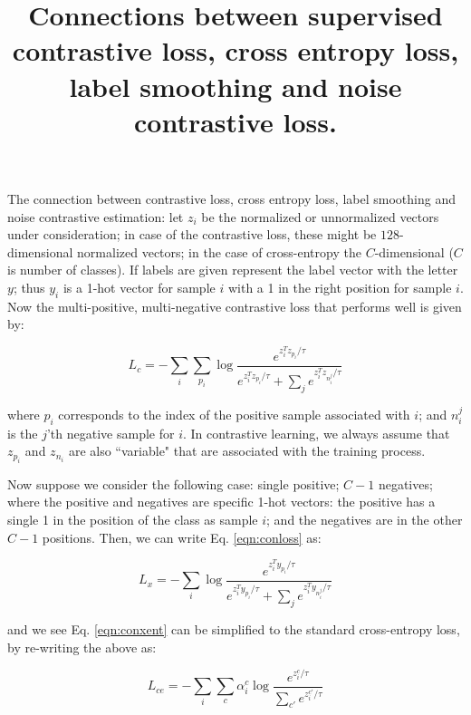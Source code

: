 \documentclass[10pt,letterpaper]{article}
\begin{document}
\title{Connections between supervised contrastive loss, cross entropy loss, label smoothing and noise contrastive loss.}

\maketitle

The connection between contrastive loss, cross entropy loss, label smoothing and noise contrastive estimation: let $z_i$ be the normalized or unnormalized vectors under consideration; in case of the contrastive loss, these might be $128$-dimensional normalized vectors; in the case of cross-entropy the $C$-dimensional ($C$ is number of classes). If labels are given represent the label vector with the letter $y$; thus $y_i$ is a 1-hot vector for sample $i$ with a 1 in the right position for sample $i$. Now the multi-positive, multi-negative contrastive loss that performs well is given by:

\begin{equation}
L_c = - \sum_i \sum_{p_i} \log \frac{e^{z_i^Tz_{p_i}/\tau}}{e^{z_i^Tz_{p_i}/\tau} + \sum_j e^{z_i^Tz_{n^j_i}/\tau}}
\label{eqn:conloss}
\end{equation}

where $p_i$ corresponds to the index of the positive sample associated with $i$; and $n^j_i$ is the $j$'th negative sample for $i$. In contrastive learning, we always assume that $z_{p_i}$ and $z_{n_i}$ are also ``variable" that are associated with the training process. 

Now suppose we consider the following case: single positive; $C-1$ negatives; where the positive and negatives are specific 1-hot vectors: the positive has a single 1 in the position of the class as sample $i$; and the negatives are in the other $C-1$ positions. Then, we can write Eq. \ref{eqn:conloss} as:

\begin{equation}
L_x = - \sum_i  \log \frac{e^{z_i^Ty_{p_i}/\tau}}{e^{z_i^Ty_{p_i}/\tau} + \sum_j e^{z_i^Ty_{n^j_i}/\tau}}
\label{eqn:conxent}
\end{equation}

and we see Eq. \ref{eqn:conxent} can be simplified to the standard cross-entropy loss, by re-writing the above as:

\begin{equation}
L_{ce} =   - \sum_i  \sum_c \alpha_i^c \log \frac{e^{z_i^c/\tau}}{\sum_{c'} e^{z_i^{c'}/\tau}}
\label{eqn:celoss}
\end{equation}
\end{document}
